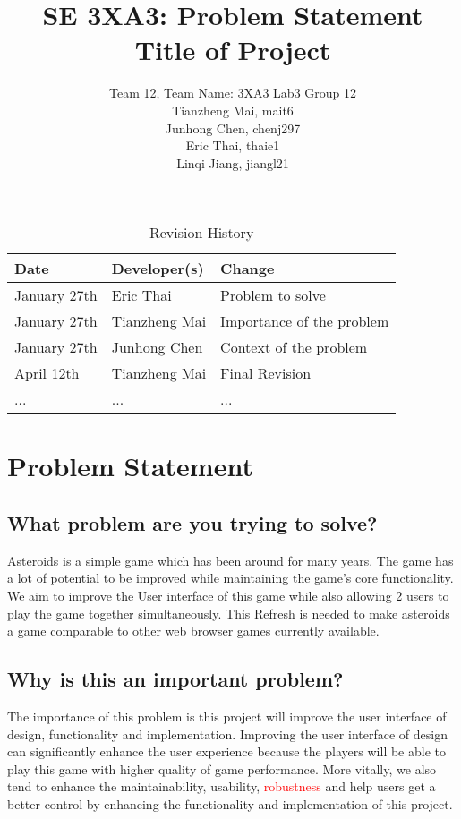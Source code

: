 \documentclass{article}
\title{SE 3XA3: Problem Statement\\Title of Project}
\author{Team 12, Team Name: 3XA3 Lab3 Group 12
		\\Tianzheng Mai, mait6
       \\Junhong Chen, chenj297 
		\\Eric Thai, thaie1
		\\Linqi Jiang, jiangl21
}
\date{}
\begin{document}
\maketitle
\begin{table}[hp]
\caption{Revision History} \label{TblRevisionHistory}
\begin{tabularx}{\textwidth}{llX}
\toprule
\textbf{Date} & \textbf{Developer(s)} & \textbf{Change}\\
\midrule
January 27th & Eric Thai & Problem to solve\\
January 27th & Tianzheng Mai & Importance of the problem\\
January 27th & Junhong Chen & Context of the problem\\
April 12th & Tianzheng Mai & Final Revision\\
... & ... & ...\\
\bottomrule
\end{tabularx}
\end{table}
\section{Problem Statement}

\subsection{What problem are you trying to solve?}
Asteroids is a simple game which has been around for many years. The game has a lot of potential to be improved while maintaining the game’s core functionality. We aim to improve the User interface of this game while also allowing 2 users to play the game together simultaneously. This Refresh is needed to make asteroids a game comparable to other web browser games currently available.
\subsection{Why is this an important problem?}
The importance of this problem is this project will improve the user interface of design, functionality and implementation. Improving the user interface of design can significantly enhance the user experience because the players will be able to play this game with higher quality of game performance. More vitally, we also tend to enhance the maintainability, usability, \textcolor{red}{robustness} and help users get a better control by enhancing the functionality and implementation of this project. 
\end{document}
